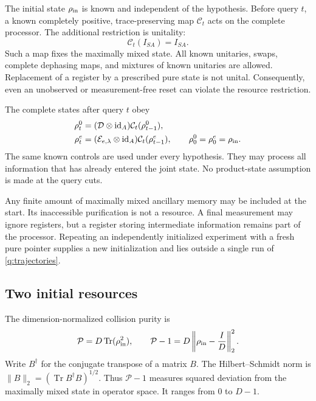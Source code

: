 \documentclass[11pt,a4paper]{article}
\numberwithin{equation}{section}
\theoremstyle{definition}
\theoremstyle{remark}
\DeclareMathOperator{\Tr}{Tr}
\begin{document}
The initial state $\rho_{\rm in}$ is known and independent of the hypothesis.
Before query $t$, a known completely positive, trace-preserving map
$\mathcal C_t$ acts on the complete processor. The additional restriction is
unitality:
\begin{equation}
 \mathcal C_t(I_{SA})=I_{SA}.
 \label{q:unital}
\end{equation}
Such a map fixes the maximally mixed state. All known unitaries, swaps,
complete dephasing maps, and mixtures of known unitaries are allowed.
Replacement of a register by a prescribed pure state is not unital.
Consequently, even an unobserved or measurement-free reset can violate the
resource restriction.

The complete states after query $t$ obey
\begin{align}
 \rho_t^0&=(\mathcal D\otimes{\rm id}_A)
                  \mathcal C_t(\rho_{t-1}^0),\nonumber\\
 \rho_t^e&=(\mathcal E_{e,\lambda}\otimes{\rm id}_A)
                  \mathcal C_t(\rho_{t-1}^e),\qquad
 \rho_0^0=\rho_0^e=\rho_{\rm in}.
 \label{q:trajectories}
\end{align}
The same known controls are used under every hypothesis. They may process all
information that has already entered the joint state. No product-state
assumption is made at the query cuts.

Any finite amount of maximally mixed ancillary memory may be included at the
start. Its inaccessible purification is not a resource. A final measurement
may ignore registers, but a register storing intermediate information remains
part of the processor. Repeating an independently initialized experiment with
a fresh pure pointer supplies a new initialization and lies outside a single
run of \eqref{q:trajectories}.

\subsection{Two initial resources}

The dimension-normalized collision purity is
\begin{equation}
 \mathcal P=D\Tr(\rho_{\rm in}^2),\qquad
 \mathcal P-1=D
       \left\|\rho_{\rm in}-\frac{I}{D}\right\|_2^2.
 \label{q:collision-resource}
\end{equation}
Write $B^\dagger$ for the conjugate transpose of a matrix $B$. The Hilbert--Schmidt norm is
$\|B\|_2=(\Tr B^\dagger B)^{1/2}$. Thus $\mathcal P-1$ measures squared
deviation from the maximally mixed state in operator space.
It ranges from $0$ to $D-1$.
\end{document}
